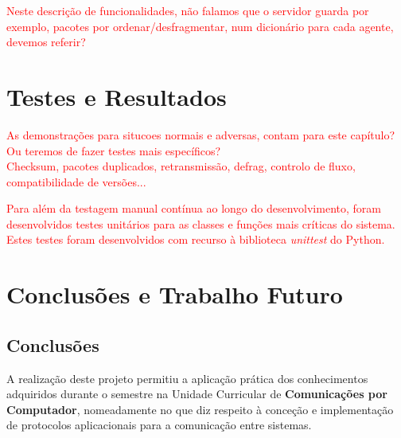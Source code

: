 \documentclass[a4paper,12pt]{scrreprt}
\begin{document}
\textcolor{red}{
    Neste descrição de funcionalidades, não falamos que o servidor guarda por exemplo,
    pacotes por ordenar/desfragmentar, num dicionário para cada agente, devemos referir?
}



\chapter{Testes e Resultados}

\textcolor{red}{
    As demonstrações para situcoes normais e adversas, contam para este capítulo?
    Ou teremos de fazer testes mais específicos? \\
    Checksum, pacotes duplicados, retransmissão, defrag, controlo de fluxo, compatibilidade de versões...
}

\textcolor{red}{
    Para além da testagem manual contínua ao longo do desenvolvimento, foram
    desenvolvidos testes unitários para as classes e funções mais críticas do
    sistema. Estes testes foram desenvolvidos com recurso à biblioteca
    \textit{unittest} do Python.
}



\chapter{Conclusões e Trabalho Futuro}

\section{Conclusões}

A realização deste projeto permitiu a aplicação prática dos conhecimentos adquiridos
durante o semestre na Unidade Curricular de \textbf{Comunicações por Computador},
nomeadamente no que diz respeito à conceção e implementação de protocolos aplicacionais
para a comunicação entre sistemas. 
\end{document}
